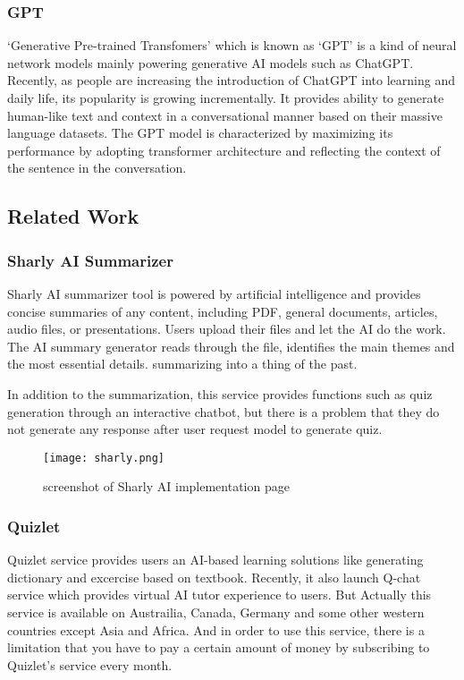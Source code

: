 \documentclass[runningheads]{llncs}
\begin{document}
\begin{spacing}{1.25}
\subsubsection{GPT} `Generative Pre-trained Transfomers' which is known as `GPT' is a kind of neural network models mainly powering generative AI models such as ChatGPT. Recently, as people are increasing the introduction of ChatGPT into learning and daily life, its popularity is growing incrementally. It provides ability to generate human-like text and context in a conversational manner based on their massive language datasets. The GPT model is characterized by maximizing its performance by adopting transformer architecture and reflecting the context of the sentence in the conversation.

\subsection{Related Work}
\subsubsection{Sharly AI Summarizer} Sharly AI summarizer tool is powered by artificial intelligence and provides concise summaries of any content, including PDF, general documents, articles, audio files, or presentations. Users upload their files and let the AI do the work. The AI summary generator reads through the file, identifies the main themes and the most essential details. summarizing into a thing of the past.

In addition to the summarization, this service provides functions such as quiz generation through an interactive chatbot, but there is a problem that they do not generate any response after user request model to generate quiz.

\begin{figure}
\texttt{[image: sharly.png]}
\caption{screenshot of Sharly AI implementation page} \label{fig2}
\end{figure}

\subsubsection{Quizlet} Quizlet service provides users an AI-based learning solutions like generating dictionary and excercise based on textbook. Recently, it also launch Q-chat service which provides virtual AI tutor experience to users. But Actually this service is available on Austrailia, Canada, Germany and some other western countries except Asia and Africa. And in order to use this service, there is a limitation that you have to pay a certain amount of money by subscribing to Quizlet's service every month.


\end{spacing}
\end{document}
